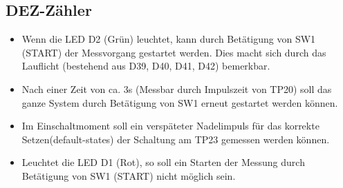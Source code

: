 \documentclass[a4paper,11pt]{scrartcl}
\begin{document}

\newpage
\subsection{DEZ-Zähler}


\begin{itemize}
	\item{Wenn die LED D2 (Grün) leuchtet, kann durch Betätigung von SW1 (START) der Messvorgang gestartet werden. Dies macht sich durch das Lauflicht (bestehend aus D39, D40, D41, D42) bemerkbar.}
	
	\item{Nach einer Zeit von ca. 3s (Messbar durch Impulszeit von TP20) soll das ganze System durch Betätigung von SW1 erneut gestartet werden können.}
	
	\item{Im Einschaltmoment soll ein verspäteter Nadelimpuls für das korrekte Setzen(default-states) der Schaltung am TP23 gemessen werden können.}
	
	 \item{Leuchtet die LED D1 (Rot), so soll ein Starten der Messung durch Betätigung von SW1 (START) nicht möglich sein.}
\end{itemize}

\end{document}
